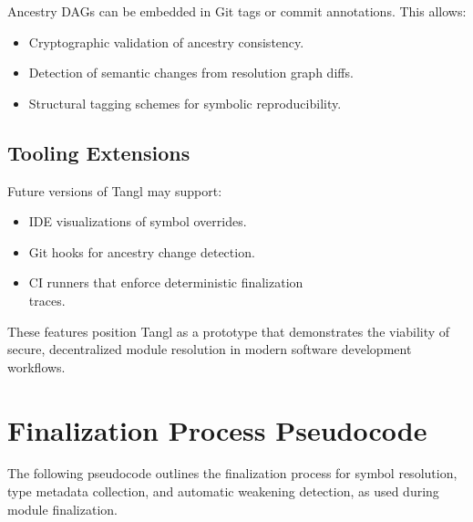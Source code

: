 \documentclass[sigplan,screen]{acmart}
\begin{document}
Ancestry DAGs can be embedded in Git tags or commit annotations. This allows:

\begin{itemize}
  \item Cryptographic validation of ancestry consistency.
  \item Detection of semantic changes from resolution graph diffs.
  \item Structural tagging schemes for symbolic reproducibility.
\end{itemize}

\subsection{Tooling Extensions}

Future versions of Tangl may support:

\begin{itemize}
  \item IDE visualizations of symbol overrides.
  \item Git hooks for ancestry change detection.
  \item CI runners that enforce deterministic finalization \\traces.
\end{itemize}

These features position Tangl as a prototype that demonstrates the viability of secure, decentralized module resolution in modern software development workflows.

\vfill\break
\section{Finalization Process Pseudocode}
\label{appendix:finalization-pseudocode}

The following pseudocode outlines the finalization process for symbol resolution, type metadata collection, and automatic weakening detection, as used during module finalization.
\end{document}
